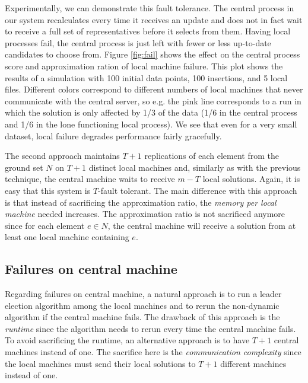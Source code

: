 Experimentally, we can demonstrate this fault tolerance. The central process in our system recalculates every time it receives an update and does not in fact wait to receive a full set of representatives before it selects from them. Having local processes fail, the central process is just left with fewer or less up-to-date candidates to choose from. Figure \ref{fig:fail} shows the effect on the central process score and approximation ration of local machine failure. This plot shows the results of a simulation with 100 initial data points, 100 insertions, and 5 local files. Different colors correspond to different numbers of local machines that never communicate with the central server, so e.g. the pink line corresponds to a run in which the solution is only affected by 1/3 of the data (1/6 in the central process and 1/6 in the lone functioning local process). We see that even for a very small dataset, local failure degrades performance fairly gracefully.

The second approach maintains $T+1$ replications of each element from the ground set $N$ on $T+1$ distinct local machines and, similarly as with the previous technique, the central machine waits to receive $m-T$ local solutions. Again, it is easy that this system is $T$-fault tolerant. The main difference with this approach is that instead of sacrificing the approximation ratio, the \textit{memory per local machine} 
needed increases. The approximation ratio is not sacrificed anymore since for each element $e \in N$, the central machine will receive a solution from at least one local machine containing $e$.

\subsection{Failures on central machine}

Regarding failures on central machine, a natural approach is to run a leader election algorithm among the local machines and to rerun the non-dynamic algorithm if the central machine fails. The drawback of this approach is the \textit{runtime} since the algorithm needs to rerun every time the central machine fails. To avoid sacrificing the runtime, an alternative approach is to have $T+1$ central machines instead of one. The sacrifice here is the \textit{communication complexity} since the local machines must send their local solutions to $T+1$ different machines instead of one.

